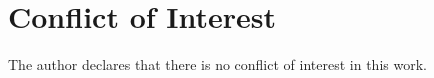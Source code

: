 
\section*{Conflict of Interest}

    The author declares that there is no conflict of interest in this work.

